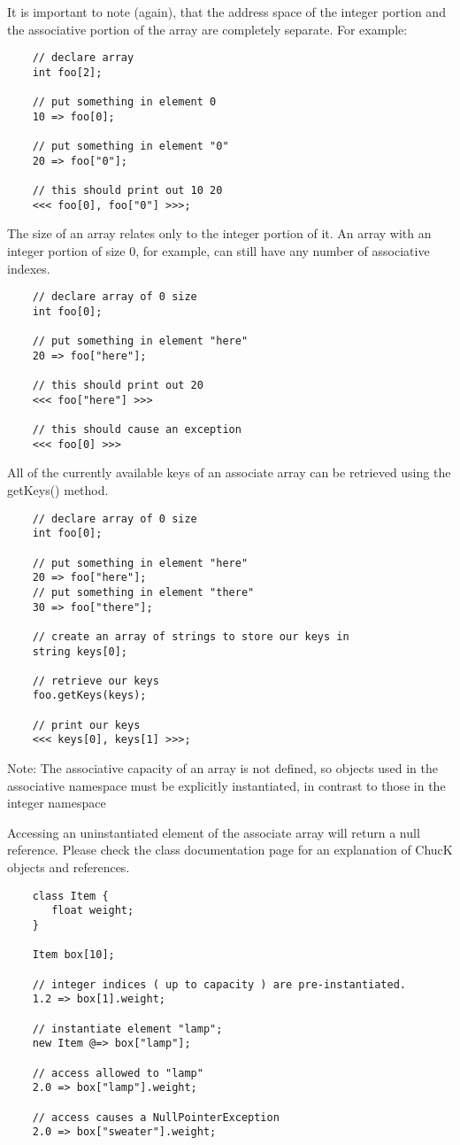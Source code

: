 It is important to note (again), that the address space of the integer portion and the associative portion of the array are completely separate. For example:
\begin{verbatim}
    // declare array
    int foo[2];

    // put something in element 0
    10 => foo[0];

    // put something in element "0"
    20 => foo["0"];

    // this should print out 10 20
    <<< foo[0], foo["0"] >>>;
\end{verbatim}

The size of an array relates only to the integer portion of it. An array with an integer portion of size 0, for example, can still have any number of associative indexes.
\begin{verbatim}
    // declare array of 0 size
    int foo[0];

    // put something in element "here"
    20 => foo["here"];

    // this should print out 20
    <<< foo["here"] >>>

    // this should cause an exception
    <<< foo[0] >>>
\end{verbatim}

All of the currently available keys of an associate array can be retrieved using the getKeys() method.
\begin{verbatim}
    // declare array of 0 size
    int foo[0];

    // put something in element "here"
    20 => foo["here"];
    // put something in element "there"
    30 => foo["there"];

    // create an array of strings to store our keys in
    string keys[0];

    // retrieve our keys
    foo.getKeys(keys);

    // print our keys
    <<< keys[0], keys[1] >>>;
\end{verbatim}

Note: The associative capacity of an array is not defined, so objects used in the associative namespace must be explicitly instantiated, in contrast to those in the integer namespace

 Accessing an uninstantiated element of the associate array will return a null reference. Please check the class documentation page for an explanation of ChucK objects and references.
\begin{verbatim}
    class Item {
       float weight;
    }

    Item box[10];

    // integer indices ( up to capacity ) are pre-instantiated.
    1.2 => box[1].weight;

    // instantiate element "lamp";
    new Item @=> box["lamp"];

    // access allowed to "lamp"
    2.0 => box["lamp"].weight;

    // access causes a NullPointerException
    2.0 => box["sweater"].weight;
\end{verbatim}


